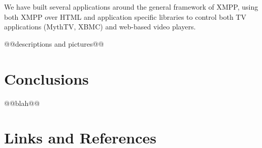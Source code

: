 \documentclass[]{article}%
\begin{document}
We have built several applications around the general framework of XMPP, using both XMPP over HTML and application specific libraries to control both TV applications (MythTV, XBMC) and web-based video players.

@@descriptions and pictures@@

\section{Conclusions}

@@blah@@





\section{Links and References}

\end{document}
